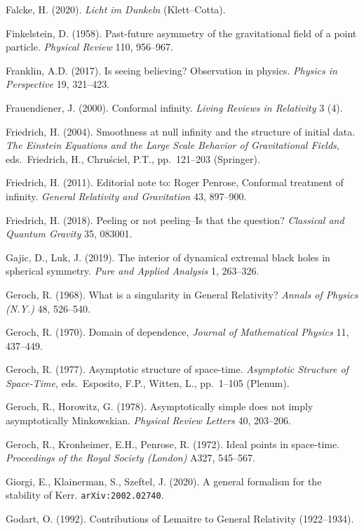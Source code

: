 \documentclass[11pt,a4paper]{article}
\begin{document}
\begin{small}
\begin{thebibliography}{99}
\item[] Falcke, H. (2020). \emph{Licht im Dunkeln} (Klett--Cotta). 
\item[]  Finkelstein, D. (1958). Past-future asymmetry of the gravitational field of a point particle.
 \emph{Physical Review} 110, 956--967. 
 \item[] Franklin, A.D. (2017). Is seeing believing? Observation in physics. \emph{Physics in Perspective} 19, 321--423. 
\item[] Frauendiener, J. (2000). Conformal infinity.  \emph{Living Reviews in Relativity} 3 (4). 
\item[]  Friedrich, H. (2004). Smoothness at null infinity and the structure of initial data.
\emph{The Einstein Equations and the Large Scale Behavior of Gravitational Fields}, eds.\ 
Friedrich, H., Chru\'{s}ciel, P.T., pp.\ 121--203 (Springer).
\item[]  Friedrich, H. (2011). Editorial note to: Roger Penrose, Conformal treatment of infinity.  \emph{General Relativity and Gravitation} 43, 897--900.
\item[]  Friedrich, H. (2018). Peeling or not peeling--Is that the question?
\emph{Classical and Quantum Gravity} 35, 083001. 
  \item[]  Gajic, D., Luk, J. (2019). 
The interior of dynamical extremal black holes in spherical symmetry. \emph{Pure and Applied Analysis} 1, 263--326. 
  \item[]  Geroch, R.   (1968). What is a singularity in General Relativity? \emph{Annals of Physics (N.Y.)} 48, 526--540.
  \item[]  Geroch, R.   (1970). Domain of dependence, \emph{ Journal of Mathematical Physics} 11, 437--449.
    \item[]  Geroch, R.   (1977). Asymptotic structure of space-time. \emph{Asymptotic Structure of Space-Time}, eds.\ Esposito, F.P., Witten, L., pp.\ 1--105  (Plenum). 
      \item []  Geroch, R., Horowitz, G. (1978).
Asymptotically simple does not imply asymptotically Minkowskian. \emph{Physical Review Letters} 40, 203--206. 
    \item []  Geroch, R., Kronheimer, E.H.,  Penrose, R. (1972). Ideal points in space-time. 
  \emph{Proceedings of the Royal Society (London)} A327, 545--567. 
    \item[]
 Giorgi, E., Klainerman,  S., Szeftel, J. (2020).  A general formalism for the stability of Kerr. 
 \texttt{arXiv:2002.02740}. 
  \item[]  Godart, O. (1992). Contributions of Lemaitre to General Relativity (1922--1934).

\end{thebibliography}
\end{small}
\end{document}
